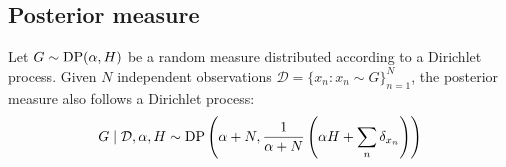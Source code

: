 \subsection{Posterior measure}
\begin{proposition}
	Let $G \sim \operatorname{DP}(\alpha, H)$ be a random measure distributed according to a Dirichlet process. Given $N$ independent observations $\mathcal D = \{x_n: x_n \sim G\}_{n = 1}^N$, the posterior measure also follows a Dirichlet process:
	\begin{equation}
		G \mid \mathcal D, \alpha, H \sim \operatorname{DP}\left(\alpha + N, \frac{1}{\alpha + N}\left(\alpha H + \sum_n \delta_{x_n}\right)\right) \label{eqn:np/dp/posterior/posterior}
	\end{equation}
\end{proposition}

